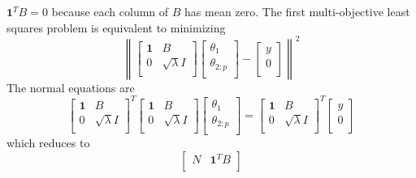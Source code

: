 \begin{enumerate}[label=(\alph*)]
\begin{tcolorbox}
		      $\mathbf{1}^T B = 0$ because each column of $B$ has mean zero. The
		      first multi-objective least squares problem is equivalent to
		      minimizing
		      $$ \left\|
			      \begin{bmatrix}
				      \mathbf{1} & B                \\
				      0          & \sqrt{\lambda} I \\
			      \end{bmatrix}
			      \begin{bmatrix}
				      \theta_1     \\
				      \theta_{2:p} \\
			      \end{bmatrix}
			      -
			      \begin{bmatrix}
				      y \\
				      0 \\
			      \end{bmatrix}
			      \right\|^2 $$
		      The normal equations are
		      $$
			      \begin{bmatrix}
				      \mathbf{1} & B                \\
				      0          & \sqrt{\lambda} I \\
			      \end{bmatrix}^T
			      \begin{bmatrix}
				      \mathbf{1} & B                \\
				      0          & \sqrt{\lambda} I \\
			      \end{bmatrix}
			      \begin{bmatrix}
				      \theta_1     \\
				      \theta_{2:p} \\
			      \end{bmatrix}
			      =
			      \begin{bmatrix}
				      \mathbf{1} & B                \\
				      0          & \sqrt{\lambda} I \\
			      \end{bmatrix}^T
			      \begin{bmatrix}
				      y \\
				      0 \\
			      \end{bmatrix}
		      $$
		      which reduces to
		      $$
			      \begin{bmatrix}
				      N              & \mathbf{1}^T B    \\

\end{bmatrix}$$
\end{tcolorbox}
\end{enumerate}

